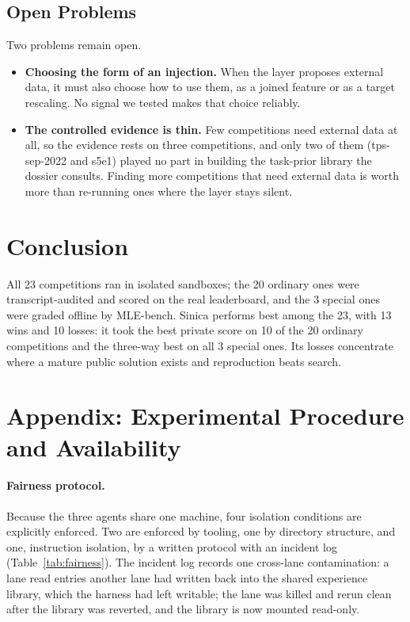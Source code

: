 \documentclass[11pt,a4paper]{article}
\begin{document}
\subsection{Open Problems}
\label{sec:future}

Two problems remain open.

\begin{itemize}[leftmargin=*]
  \item \textbf{Choosing the form of an injection.} When the layer proposes external data, it must also choose how to use them, as a joined feature or as a target rescaling. No signal we tested makes that choice reliably.
  \item \textbf{The controlled evidence is thin.} Few competitions need external data at all, so the evidence rests on three competitions, and only two of them (tps-sep-2022 and s5e1) played no part in building the task-prior library the dossier consults. Finding more competitions that need external data is worth more than re-running ones where the layer stays silent.\end{itemize}

\section{Conclusion}

All 23 competitions ran in isolated sandboxes; the 20 ordinary ones were transcript-audited and scored on the real leaderboard, and the 3 special ones were graded offline by MLE-bench. Sinica performs best among the 23, with 13 wins and 10 losses: it took the best private score on 10 of the 20 ordinary competitions and the three-way best on all 3 special ones. Its losses concentrate where a mature public solution exists and reproduction beats search.
\clearpage
\appendix

\section*{Appendix: Experimental Procedure and Availability}

\paragraph{Fairness protocol.} Because the three agents share one machine, four isolation conditions are explicitly enforced. Two are enforced by tooling, one by directory structure, and one, instruction isolation, by a written protocol with an incident log (Table~\ref{tab:fairness}). The incident log records one cross-lane contamination: a lane read entries another lane had written back into the shared experience library, which the harness had left writable; the lane was killed and rerun clean after the library was reverted, and the library is now mounted read-only.
\end{document}
